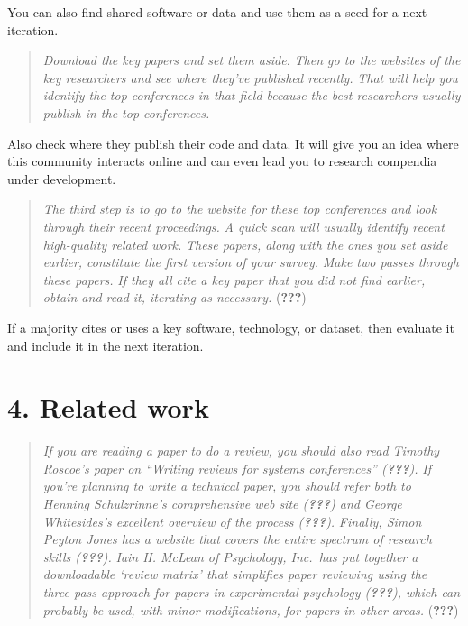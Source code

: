 \documentclass[twocolumn]{article}
\begin{document}
You can also find shared software or data and use them as a seed for a
next iteration.

\begin{quote}
\emph{Download the key papers and set them aside.} \emph{Then go to the
websites of the key researchers and see where they've published
recently.} \emph{That will help you identify the top conferences in that
field because the best researchers usually publish in the top
conferences.}
\end{quote}

Also check where they publish their code and data. It will give you an
idea where this community interacts online and can even lead you to
research compendia under development.

\begin{quote}
\emph{The third step is to go to the website for these top conferences
and look through their recent proceedings.} \emph{A quick scan will
usually identify recent high-quality related work.} \emph{These papers,
along with the ones you set aside earlier, constitute the first version
of your survey.} \emph{Make two passes through these papers.} \emph{If
they all cite a key paper that you did not find earlier, obtain and read
it, iterating as necessary.} ({\textbf{???}})
\end{quote}

If a majority cites or uses a key software, technology, or dataset, then
evaluate it and include it in the next iteration.

\hypertarget{related-work}{%
\section*{4. Related work}\label{related-work}}

\begin{quote}
\emph{If you are reading a paper to do a review, you should also read
Timothy Roscoe's paper on ``Writing reviews for systems conferences''
({\textbf{???}}).} \emph{If you're planning to write a technical paper,
you should refer both to Henning Schulzrinne's comprehensive web site
({\textbf{???}}) and George Whitesides's excellent overview of the
process ({\textbf{???}}).} \emph{Finally, Simon Peyton Jones has a
website that covers the entire spectrum of research skills
({\textbf{???}}).} \emph{Iain H. McLean of Psychology, Inc.~has put
together a downloadable `review matrix' that simplifies paper reviewing
using the three-pass approach for papers in experimental psychology
({\textbf{???}}), which can probably be used, with minor modifications,
for papers in other areas.} ({\textbf{???}})
\end{quote}
\end{document}
